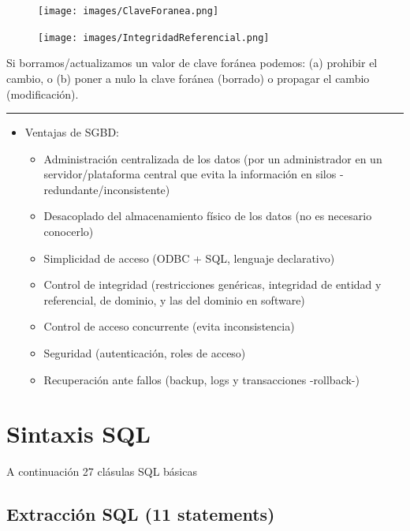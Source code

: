 \documentclass[]{book}
\providecommand{\tightlist}{%
  \setlength{\itemsep}{0pt}\setlength{\parskip}{0pt}}
\begin{document}
\begin{figure}
\centering
\texttt{[image: images/ClaveForanea.png]}
\caption{}
\end{figure}

\begin{figure}
\centering
\texttt{[image: images/IntegridadReferencial.png]}
\caption{}
\end{figure}

Si borramos/actualizamos un valor de clave foránea podemos: (a) prohibir
el cambio, o (b) poner a nulo la clave foránea (borrado) o propagar el
cambio (modificación).

\begin{center}\rule{0.5\linewidth}{0.5pt}\end{center}

\begin{itemize}
\tightlist
\item
  Ventajas de SGBD:

  \begin{itemize}
  \tightlist
  \item
    Administración centralizada de los datos (por un administrador en un
    servidor/plataforma central que evita la información en silos
    -redundante/inconsistente)
  \item
    Desacoplado del almacenamiento físico de los datos (no es necesario
    conocerlo)
  \item
    Simplicidad de acceso (ODBC + SQL, lenguaje declarativo)
  \item
    Control de integridad (restricciones genéricas, integridad de
    entidad y referencial, de dominio, y las del dominio en software)
  \item
    Control de acceso concurrente (evita inconsistencia)
  \item
    Seguridad (autenticación, roles de acceso)
  \item
    Recuperación ante fallos (backup, logs y transacciones -rollback-)
  \end{itemize}
\end{itemize}

\section{Sintaxis SQL}\label{sintaxis-sql}

A continuación 27 clásulas SQL básicas

\subsection{Extracción SQL (11
statements)}\label{extracciuxf3n-sql-11-statements}
\end{document}
